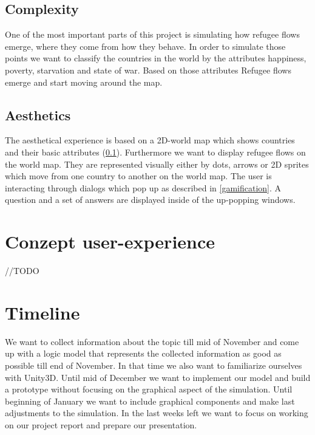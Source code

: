 \documentclass{acm_proc_article-sp}
\begin{document}
\subsection{Complexity}
\label{complexity}
One of the most important parts of this project is simulating how refugee flows emerge, where they come from how they behave. In order to simulate those points we want to classify the countries in the world by the attributes happiness, poverty, starvation and state of war. Based on those attributes Refugee flows emerge and start moving around the map.
\subsection{Aesthetics}
The aesthetical experience is based on a 2D-world map which shows countries and their basic attributes (\ref{complexity}). Furthermore we want to display refugee flows on the world map. They are represented visually  either  by dots, arrows or 2D sprites which move from one country to another on the world map. The user is interacting through dialogs which pop up as described in \ref{gamification}. A question and a set of answers are displayed inside of the up-popping windows.


\section{Conzept user-experience}
//TODO

\section{Timeline}
We want to collect information about the topic till mid of November and come up with a logic model that represents the collected information as good as possible till end of November. In that time we also want to familiarize ourselves with Unity3D. Until mid of  December we want to implement our model and build a prototype without focusing on the graphical aspect of the simulation.  Until beginning of January we want to include graphical components and make last adjustments to the simulation. In the last weeks left we want to focus on working on our project report and prepare our presentation.


 
\end{document}
